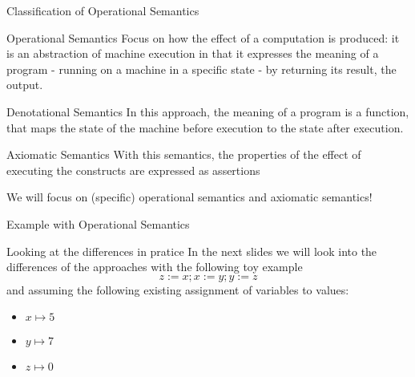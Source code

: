 \documentclass[aspectratio=169]{beamer}
\begin{document}
\begin{slide}{Classification of Operational Semantics}
  \begin{block}{Operational Semantics}
    Focus on how the effect of a computation is produced: it is an abstraction of machine execution in that it expresses the meaning of a program - running on a machine in a specific state - by returning its result, the output.
  \end{block}
  \begin{block}{Denotational Semantics}
    In this approach, the meaning of a program is a function, that maps the state of the machine before execution to the state after execution.
  \end{block}
  \begin{block}{Axiomatic Semantics}
    With this semantics, the properties of the effect of executing the constructs
are expressed as assertions
  \end{block}
We will focus on (specific) operational semantics and axiomatic semantics!
\end{slide}

\begin{slide}{Example with Operational Semantics}
\begin{block}{Looking at the differences in pratice}
In the next slides we will look into the differences of the approaches with the following toy example
$$z:= x; x:= y; y := z$$ and assuming the following existing assignment of variables to values:
\begin{itemize}
\item $x \mapsto 5$
\item $y \mapsto 7$
\item $z \mapsto 0$  
\end{itemize}
\end{block}
\end{slide}
\end{document}
